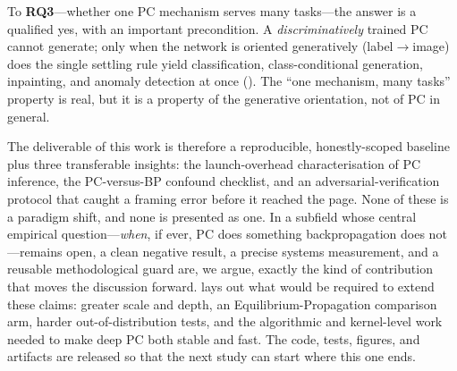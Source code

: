 To \textbf{RQ3}---whether one PC mechanism serves many tasks---the answer is a qualified yes, with
an important precondition. A \emph{discriminatively} trained PC cannot generate; only when the
network is oriented generatively (label$\rightarrow$image) does the single settling rule yield
classification, class-conditional generation, inpainting, and anomaly detection at once
(). The ``one mechanism, many tasks'' property is real, but it is a property of
the generative orientation, not of PC in general.

The deliverable of this work is therefore a reproducible, honestly-scoped baseline plus three
transferable insights: the launch-overhead characterisation of PC inference, the PC-versus-BP
confound checklist, and an adversarial-verification protocol that caught a framing error before it
reached the page. None of these is a paradigm shift, and none is presented as one. In a subfield
whose central empirical question---\emph{when}, if ever, PC does something backpropagation does
not---remains open, a clean negative result, a precise systems measurement, and a reusable
methodological guard are, we argue, exactly the kind of contribution that moves the discussion
forward.  lays out what would be required to extend these claims: greater
scale and depth, an Equilibrium-Propagation comparison arm, harder out-of-distribution tests, and
the algorithmic and kernel-level work needed to make deep PC both stable and fast. The code,
tests, figures, and artifacts are released so that the next study can start where this one ends.
